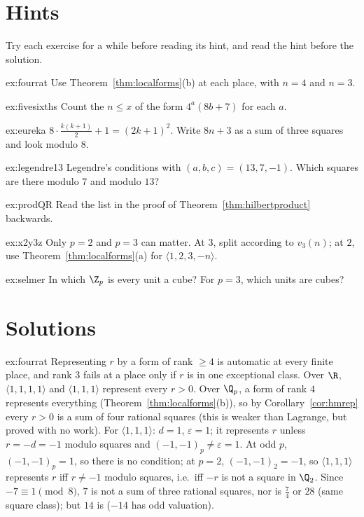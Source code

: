 \section{Hints}

Try each exercise for a while before reading its hint, and read the hint before the solution.

\begin{hint}{ex:fourrat}
Use Theorem~\ref{thm:localforms}(b) at each place, with $n=4$ and $n=3$.
\end{hint}
\begin{hint}{ex:fivesixths}
Count the $n\le x$ of the form $4^a(8b+7)$ for each $a$.
\end{hint}
\begin{hint}{ex:eureka}
$8\cdot\frac{k(k+1)}2+1=(2k+1)^2$. Write $8n+3$ as a sum of three squares and look modulo $8$.
\end{hint}
\begin{hint}{ex:legendre13}
Legendre's conditions with $(a,b,c)=(13,7,-1)$. Which squares are there modulo $7$ and modulo $13$?
\end{hint}
\begin{hint}{ex:prodQR}
Read the list in the proof of Theorem~\ref{thm:hilbertproduct} backwards.
\end{hint}
\begin{hint}{ex:x2y3z}
Only $p=2$ and $p=3$ can matter. At $3$, split according to $v_3(n)$; at $2$, use Theorem~\ref{thm:localforms}(a) for
$\langle1,2,3,-n\rangle$.
\end{hint}
\begin{hint}{ex:selmer}
In which $\Z_p$ is every unit a cube? For $p=3$, which units are cubes?
\end{hint}

\section{Solutions}

\begin{solution}{ex:fourrat}
\idea Representing $r$ by a form of rank $\ge4$ is automatic at every finite place, and rank $3$ fails at a place only if
$r$ is in one exceptional class.
\writeup Over $\R$, $\langle1,1,1,1\rangle$ and $\langle1,1,1\rangle$ represent every $r>0$. Over $\Q_p$, a form of rank $4$ represents
everything (Theorem~\ref{thm:localforms}(b)), so by Corollary~\ref{cor:hmrep} every $r>0$ is a sum of four rational squares (this
is weaker than Lagrange, but proved with no work). For $\langle1,1,1\rangle$: $d=1$, $\varepsilon=1$; it represents $r$ unless $r=-d=-1$
modulo squares and $(-1,-1)_p\ne\varepsilon=1$. At odd $p$, $(-1,-1)_p=1$, so there is no condition; at $p=2$, $(-1,-1)_2=-1$, so
$\langle1,1,1\rangle$ represents $r$ iff $r\ne-1$ modulo squares, i.e.\ iff $-r$ is not a square in $\Q_2$. Since $-7\equiv1\pmod8$,
$7$ is not a sum of three rational squares, nor is $\frac74$ or $28$ (same square class); but $14$ is ($-14$ has odd valuation).
\end{solution}

